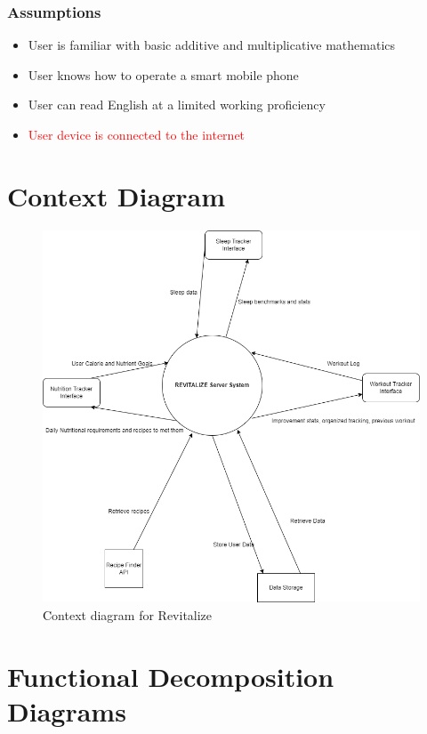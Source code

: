 \documentclass[12pt,letterpaper]{article}
\begin{document}
\subsubsection{Assumptions}
\begin{itemize}
	\item User is familiar with basic additive and multiplicative mathematics
	\item User knows how to operate a smart mobile phone
	\item User can read English at a limited working proficiency
	\item {\textcolor{red}{User device is connected to the internet}}
\end{itemize}
\section{Context Diagram}
\begin{figure}[H]
	\centering
	\includegraphics[scale=0.5]{cont_diag.png}
	\caption{\textcolor{black} Context diagram for Revitalize}
\end{figure}


\section{Functional Decomposition Diagrams}
\end{document}
